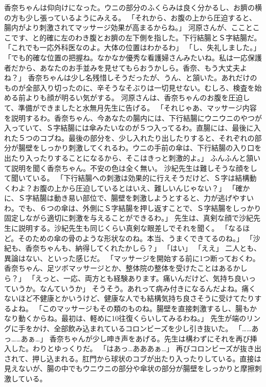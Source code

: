 香奈ちゃんは仰向けになった。ウニの部分のふくらみは良く分かるし、お臍の横の方も少し張っているようにみえる。
「それから、お腹の上から圧迫すると、腸内がより刺激されてマッサージ効果が高まるからね。」
河原さんが、こことここです、と的確に左のわき腹とお臍の左下側を指した。下行結腸とＳ字結腸だ。
「これでも一応外科医なのよ。大体の位置はわかるわ」
「し、失礼しました。」
「でも的確な位置の把握ね。なかなか優秀な看護婦さんみたいね。私は一応保護者だから、あなたのお手並みを見せてもらおうかしら。香奈、もう大丈夫よね？」
香奈ちゃんは少し名残惜しそうだったが、うん、と頷いた。あれだけのものが全部入り切ったのに、辛そうなそぶりは一切見せない。むしろ、検査を始める前よりも顔が明るい気がする。
河原さんは、香奈ちゃんのお腹を圧迫して、準備ができましたと水無月先生に告げる。
「それじゃあ、マッサージ内容を説明するわ。香奈ちゃん、今あなたの腸内には、下行結腸にウニウニのやつが入っていて、Ｓ字結腸には傘みたいなのが５つ入ってるわ。直腸には、最後に入れた５つのコブね。最後の部分を、少し入れたり出したりすると、それぞれの部分が腸壁をしっかり刺激してくれるわ。ウニの手前の傘は、下行結腸の入り口を出たり入ったりすることになるから、そこはきっと刺激的よ。」
ふんふんと頷いて説明を聞く香奈ちゃん。不安の色は全く無い。
沙紀先生は難しそうな顔をして聞いている。
「下行結腸への刺激は効果的に行えそうだけど、Ｓ字は結構動くわよ？お腹の上から圧迫しているとはいえ、難しいんじゃない？」
「確かに、Ｓ字結腸は動き易い部位で、腸壁を刺激しようとすると、力が逃げやすいわ。でも、６つの傘は、外側にＳ字結腸を押し返すことで、Ｓ字結腸をしっかり固定しながら適切に刺激を与えることができるわ。」
先生は、真剣な顔で沙紀先生に説明する。沙紀先生も同じくらい真剣な眼差しでそれを聞く。
「なるほど。そのための傘の骨のような形状なのね。本当、うまくできてるのね。」
「沙紀も、香奈ちゃんも、納得してくれたかしら？」
「はい」
「ええ」
二人とも、異論はない、といった感じだ。
「マッサージを開始する前に1つ断っておくわ。香奈ちゃん、足ツボマッサージとか、整体院の整体を受けたことはあるかしら？」
「えっと、一応、両方とも経験あります。痛いんだけど、気持ち良いっていうか。なんていうか」
そうそう。あれって病み付きになるんだよね。痛くないほど不健康とかいうけど、健康な人でも結構気持ち良さそうに受けてたりするよね。
「このマッサージもその類のものね。腸壁を直接刺激するし、腸もかなり動くからね。最初は、軽めに10往復くらいしてみるわね。」
先生が端のリングに手をかけ、全部飲み込まれているコロンビーズを少し引き抜いた。
「……あっ……あぁ…」
香奈ちゃんが少し呻き声をあげる。先生は構わずにそれを再び挿入した。わりとゆっくりだ。
「はあっ…あああぁ…」
再びコロンビーズが抜き出されて、押し込まれる。肛門から球状のコブが出たり入ったりしている。直接は見えないが、腸の中でもウニウニの部分や傘状の部分が腸壁をしっかりと摩擦刺激している。
